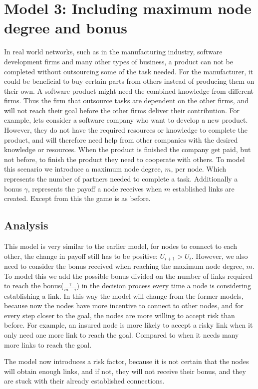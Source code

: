 

\section{Model 3: Including maximum node degree and bonus}
In real world networks, such as in the manufacturing industry, software development firms and many other types of business, a product can not be completed without outsourcing some of the task needed. For the manufacturer, it could be beneficial to buy certain parts from others instead of producing them on their own. A software product might need the combined knowledge from different firms. Thus the firm that outsource tasks are dependent on the other firms, and will not reach their goal before the other firms deliver their contribution. 
For example, lets consider a software company who want to develop a new product. However, they do not have the required resources or knowledge to complete the product, and will therefore need help from other companies with the desired knowledge or resources. When the product is finished the company get paid, but not before, to finish the product they need to cooperate with others.
To model this scenario we introduce a maximum node degree, $m$, per node. Which represents the number of partners needed to complete a task. Additionally a bonus $\gamma$, represents the payoff a node receives when $m$ established links are created. Except from this the game is as before.
\subsection{Analysis}
This model is very similar to the earlier model, for nodes to connect to each other, the change in payoff still has to be positive: $U_{i+1} > U_{i}$. However, we also need to consider the bonus received when reaching the maximum node degree, $m$. 
To model this we add the possible bonus divided on the number of links required to reach the bonus($\frac{\gamma}{m-i}$) in the decision process every time a node is considering establishing a link. 
In this way the model will change from the former models, because now the nodes have more incentive to connect to other nodes, and for every step closer to the goal, the nodes are more willing to accept risk than before. For example, an insured node is more likely to accept a risky link when it only need one more link to reach the goal. Compared to when it needs many more links to reach the goal.

 The model now introduces a risk factor, because it is not certain that the nodes will obtain enough links, and if not, they will not receive their bonus, and they are stuck with their already established connections. 

